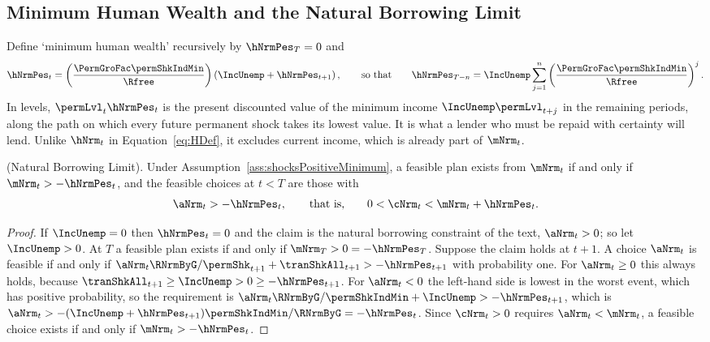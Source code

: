 \documentclass[\econtexRoot/BufferStockTheory]{subfiles}
\begin{document}
\subsection{Minimum Human Wealth and the Natural Borrowing Limit}\label{subsec:MinimumHumanWealth}

Define `minimum human wealth' recursively by $\hNrmPes_{T}=0$ and
\begin{equation}\label{eq:hNrmMinRecursion}
  \hNrmPes_{t}=\left(\frac{\PermGroFac\permShkIndMin}{\Rfree}\right)\left(\IncUnemp+\hNrmPes_{t+1}\right),
  \qquad\text{so that}\qquad
  \hNrmPes_{T-n}=\IncUnemp\sum_{j=1}^{n}\left(\frac{\PermGroFac\permShkIndMin}{\Rfree}\right)^{j}.
\end{equation}
In levels, $\permLvl_{t}\hNrmPes_{t}$ is the present discounted value of the minimum income $\IncUnemp\permLvl_{t+j}$ in the remaining periods, along the path on which every future permanent shock takes its lowest value.
It is what a lender who must be repaid with certainty will lend.
Unlike $\hNrm_{t}$ in Equation~\eqref{eq:HDef}, it excludes current income, which is already part of $\mNrm_{t}$.

\begin{lemma}(Natural Borrowing Limit).\label{lemma:NaturalBorrowingLimit}
Under Assumption~\ref{ass:shocksPositiveMinimum}, a feasible plan exists from $\mNrm_{t}$ if and only if $\mNrm_{t}>-\hNrmPes_{t}$, and the feasible choices at $t<T$ are those with
\begin{equation}\label{eq:NaturalBorrowingLimit}
  \aNrm_{t}>-\hNrmPes_{t},\qquad\text{that is,}\qquad 0<\cNrm_{t}<\mNrm_{t}+\hNrmPes_{t}.
\end{equation}
\end{lemma}

\begin{proof}
If $\IncUnemp=0$ then $\hNrmPes_{t}=0$ and the claim is the natural borrowing constraint of the text, $\aNrm_{t}>0$; so let $\IncUnemp>0$.
At $T$ a feasible plan exists if and only if $\mNrm_{T}>0=-\hNrmPes_{T}$.
Suppose the claim holds at $t+1$.
A choice $\aNrm_{t}$ is feasible if and only if $\aNrm_{t}\RNrmByG/\permShk_{t+1}+\tranShkAll_{t+1}>-\hNrmPes_{t+1}$ with probability one.
For $\aNrm_{t}\geq 0$ this always holds, because $\tranShkAll_{t+1}\geq\IncUnemp>0\geq-\hNrmPes_{t+1}$.
For $\aNrm_{t}<0$ the left-hand side is lowest in the worst event, which has positive probability, so the requirement is $\aNrm_{t}\RNrmByG/\permShkIndMin+\IncUnemp>-\hNrmPes_{t+1}$, which is $\aNrm_{t}>-(\IncUnemp+\hNrmPes_{t+1})\permShkIndMin/\RNrmByG=-\hNrmPes_{t}$.
Since $\cNrm_{t}>0$ requires $\aNrm_{t}<\mNrm_{t}$, a feasible choice exists if and only if $\mNrm_{t}>-\hNrmPes_{t}$.
\end{proof}
\end{document}
